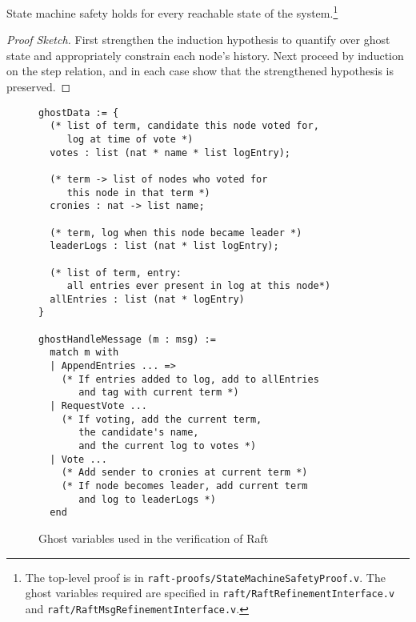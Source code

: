 \begin{theorem}
  State machine safety holds for every reachable state of the system.\footnote{The top-level proof is in \texttt{raft-proofs/StateMachineSafetyProof.v}. The ghost variables required are specified in \texttt{raft/RaftRefinement\allowbreak Interface.v} and \texttt{raft/RaftMsgRefinementInterface.v}.}
\end{theorem}
\begin{proof}[Proof Sketch]
  First strengthen the induction hypothesis
  to quantify over ghost state
  and appropriately constrain each node's history.
  Next proceed by induction on the step relation,
  and in each case show that the strengthened hypothesis is preserved.
\end{proof}

\begin{figure}
  \centering
  \small
\begin{lstlisting}[language=caml,basicstyle=\scriptsize\tt,morekeywords={output,send,nop}]
ghostData := {
  (* list of term, candidate this node voted for,
     log at time of vote *)
  votes : list (nat * name * list logEntry);

  (* term -> list of nodes who voted for
     this node in that term *)
  cronies : nat -> list name;

  (* term, log when this node became leader *)
  leaderLogs : list (nat * list logEntry);

  (* list of term, entry:
     all entries ever present in log at this node*)
  allEntries : list (nat * logEntry)
}

ghostHandleMessage (m : msg) :=
  match m with
  | AppendEntries ... =>
    (* If entries added to log, add to allEntries
       and tag with current term *)
  | RequestVote ...
    (* If voting, add the current term,
       the candidate's name,
       and the current log to votes *)
  | Vote ...
    (* Add sender to cronies at current term *)
    (* If node becomes leader, add current term
       and log to leaderLogs *)
  end
\end{lstlisting}
  \caption{Ghost variables used in the verification of Raft}
  \label{fig:raft-ghost-variables}
\end{figure}


